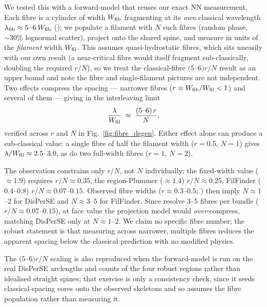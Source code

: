 \documentclass[usenatbib,twoside,twocolumn]{mnras}
\begin{document}
We tested this with a forward-model that reuses our exact NN measurement. Each fibre is a cylinder of width $W_{\rm fib}$ fragmenting at its \emph{own} classical wavelength $\lambda_{\rm fib}\approx5$--$6\,W_{\rm fib}$ (\citealt{Fischera2012}); we populate a filament with $N$ such fibres (random phase, $\sim30\%$ lognormal scatter), project onto the shared spine, and measure in units of the \emph{filament} width $W_{\rm fil}$. This assumes quasi-hydrostatic fibres, which sits uneasily with our own result (a near-critical fibre would itself fragment sub-classically, doubling the required $r/N$), so we treat the classical-fibre $(5$--$6)r/N$ result as an upper bound and note the fibre and single-filament pictures are not independent. Two effects compress the spacing --- narrower fibres ($r\equiv W_{\rm fib}/W_{\rm fil}<1$) and several of them --- giving in the interleaving limit
\begin{equation}
\frac{\lambda}{W_{\rm fil}} \;\approx\; \frac{(5\text{--}6)\,r}{N},
\label{eq:fourrn}
\end{equation}
verified across $r$ and $N$ in Fig.~\ref{fig:fibre_degen}. Either effect alone can produce a sub-classical value: a single fibre of half the filament width ($r=0.5$, $N=1$) gives $\lambda/W_{\rm fil}\approx2.5$--$3.0$, as do two full-width fibres ($r=1$, $N=2$).

The observation constrains only $r/N$, not $N$ individually: the fixed-width value ($\approx1.9$) requires $r/N\approx0.35$, the region-Plummer ($\approx1.4$) $r/N\approx0.25$, FilFinder ($0.4$--$0.8$) $r/N\approx0.07$--$0.15$. Observed fibre widths ($r\approx0.3$--$0.5$; \citealt{Hacar2013,Hacar2018}) then imply $N\approx1$--$2$ for DisPerSE and $N\approx3$--$5$ for FilFinder. Since \citet{Hacar2013} resolve $3$--$5$ fibres per bundle ($r/N\approx0.07$--$0.15$), at face value the projection model would \emph{over}-compress, matching DisPerSE only at $N\approx1$--$2$. We claim no specific fibre number; the robust statement is that measuring across narrower, multiple fibres reduces the apparent spacing below the classical prediction with no modified physics.

The $(5$--$6)r/N$ scaling is also reproduced when the forward-model is run on the real DisPerSE arclengths and counts of the four robust regions rather than idealised straight spines; that exercise is only a consistency check, since it seeds classical-spacing cores onto the observed skeletons and so assumes the fibre population rather than measuring it.
\end{document}
